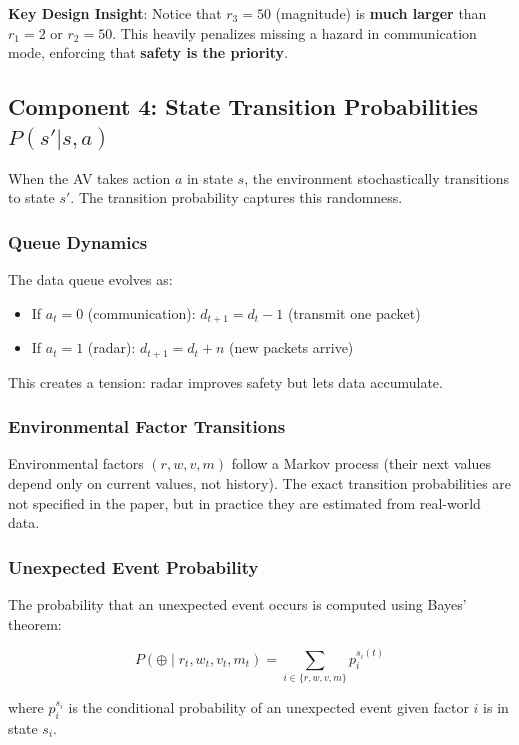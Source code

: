 \documentclass[12pt,a4paper]{article}
\begin{document}
\textbf{Key Design Insight}: Notice that $r_3 = 50$ (magnitude) is \textbf{much larger} than $r_1 = 2$ or $r_2 = 50$. This heavily penalizes missing a hazard in communication mode, enforcing that \textbf{safety is the priority}.

\subsection{Component 4: State Transition Probabilities $P(s' | s, a)$}

When the AV takes action $a$ in state $s$, the environment stochastically transitions to state $s'$. The transition probability captures this randomness.

\subsubsection{Queue Dynamics}

The data queue evolves as:
\begin{itemize}
    \item If $a_t = 0$ (communication): $d_{t+1} = d_t - 1$ (transmit one packet)
    \item If $a_t = 1$ (radar): $d_{t+1} = d_t + n$ (new packets arrive)
\end{itemize}

This creates a tension: radar improves safety but lets data accumulate.

\subsubsection{Environmental Factor Transitions}

Environmental factors $(r, w, v, m)$ follow a Markov process (their next values depend only on current values, not history). The exact transition probabilities are not specified in the paper, but in practice they are estimated from real-world data.

\subsubsection{Unexpected Event Probability}

The probability that an unexpected event occurs is computed using Bayes' theorem:

\[
P(\oplus \mid r_t, w_t, v_t, m_t) = \sum_{i \in \{r,w,v,m\}} p_i^{s_i(t)}
\]

where $p_i^{s_i}$ is the conditional probability of an unexpected event given factor $i$ is in state $s_i$.
\end{document}

